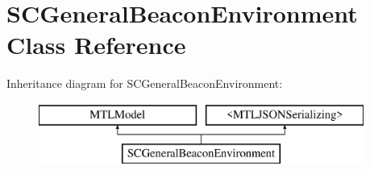 \hypertarget{interface_s_c_general_beacon_environment}{}\section{S\+C\+General\+Beacon\+Environment Class Reference}
\label{interface_s_c_general_beacon_environment}
Inheritance diagram for S\+C\+General\+Beacon\+Environment\+:\begin{figure}[H]
\begin{center}
\leavevmode
\includegraphics[height=2.000000cm]{interface_s_c_general_beacon_environment}
\end{center}
\end{figure}
